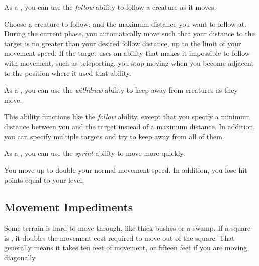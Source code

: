          As a , you can use the \textit{follow} ability to follow a creature as it moves.

        \begin{freeability}{}
            Choose a creature to follow, and the maximum distance you want to follow at.
            During the current phase, you automatically move such that your distance to the target is no greater than your desired follow distance, up to the limit of your movement speed.
            If the target uses an ability that makes it impossible to follow with movement, such as teleporting, you stop moving when you become adjacent to the position where it used that ability.
        \end{freeability}

         As a , you can use the \textit{withdraw} ability to keep away from creatures as they move.

        \begin{freeability}{}
            This ability functions like the \textit{follow} ability, except that you specify a minimum distance between you and the target instead of a maximum distance.
            In addition, you can specify multiple targets and try to keep away from all of them.
        \end{freeability}

         As a , you can use the \textit{sprint} ability to move more quickly.

        \begin{freeability}{}
            You move up to double your normal movement speed.
            In addition, you lose hit points equal to your level.
        \end{freeability}

    \subsection{Movement Impediments}

        \label{Difficult Terrain}
        Some terrain is hard to move through, like thick bushes or a swamp.
        If a square is , it doubles the movement cost required to move out of the square.
        That generally means it takes ten feet of movement, or fifteen feet if you are moving diagonally.

